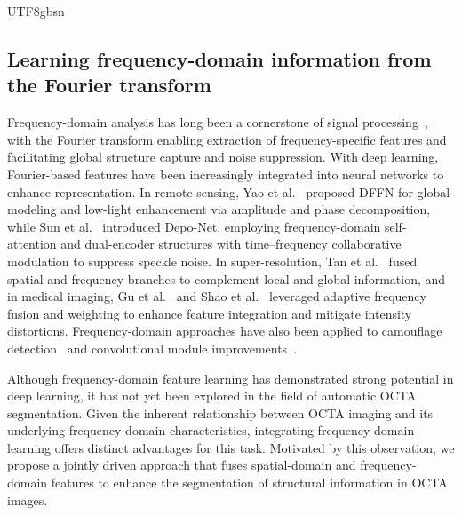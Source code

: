 \documentclass[times, review, 10pt]{elsarticle}
\begin{document}
\begin{CJK}{UTF8}{gbsn}
\subsection{Learning frequency-domain information from the Fourier transform}
Frequency-domain analysis has long been a cornerstone of signal processing~\cite{ref11}, with the Fourier transform enabling extraction of frequency-specific features and facilitating global structure capture and noise suppression. With deep learning, Fourier-based features have been increasingly integrated into neural networks to enhance representation. In remote sensing, Yao et al.~\cite{ref14} proposed DFFN for global modeling and low-light enhancement via amplitude and phase decomposition, while Sun et al.~\cite{ref15} introduced Depo-Net, employing frequency-domain self-attention and dual-encoder structures with time–frequency collaborative modulation to suppress speckle noise. In super-resolution, Tan et al.~\cite{ref16} fused spatial and frequency branches to complement local and global information, and in medical imaging, Gu et al.~\cite{ref17} and Shao et al.~\cite{ref18} leveraged adaptive frequency fusion and weighting to enhance feature integration and mitigate intensity distortions. Frequency-domain approaches have also been applied to camouflage detection~\cite{ref19} and convolutional module improvements~\cite{ref20}.
\par
Although frequency-domain feature learning has demonstrated strong potential in deep learning, it has not yet been explored in the field of automatic OCTA segmentation. Given the inherent relationship between OCTA imaging and its underlying frequency-domain characteristics, integrating frequency-domain learning offers distinct advantages for this task. Motivated by this observation, we propose a jointly driven approach that fuses spatial-domain and frequency-domain features to enhance the segmentation of structural information in OCTA images.


\end{CJK}
\end{document}
